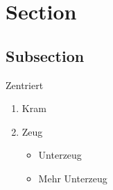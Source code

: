 \documentclass[a4paper,12pt]{article}
\begin{document}
\section{Section}
\subsection{Subsection}


\begin{center}
 Zentriert

\end{center}

\begin{enumerate}
\item Kram
\item Zeug
	\begin{itemize}
	\item Unterzeug
	\item Mehr Unterzeug
	\end{itemize}
\end{enumerate}
\end{document}
